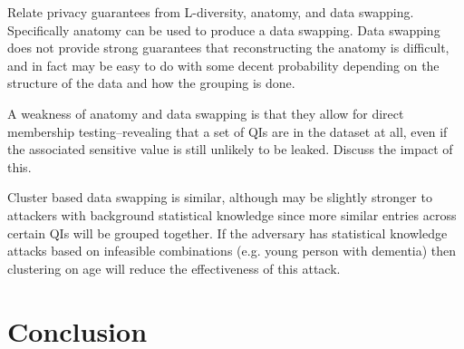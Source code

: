 Relate privacy guarantees from L-diversity, anatomy, and data swapping. Specifically anatomy can be used to produce a data swapping. Data swapping does not provide strong guarantees that reconstructing the anatomy is difficult, and in fact may be easy to do with some decent probability depending on the structure of the data and how the grouping is done.

A weakness of anatomy and data swapping is that they allow for direct membership testing--revealing that a set of QIs are in the dataset at all, even if the associated sensitive value is still unlikely to be leaked. Discuss the impact of this.

Cluster based data swapping is similar, although may be slightly stronger to attackers with background statistical knowledge since more similar entries across certain QIs will be grouped together. If the adversary has statistical knowledge attacks based on infeasible combinations (e.g. young person with dementia) then clustering on age will reduce the effectiveness of this attack.

\section{Conclusion}







